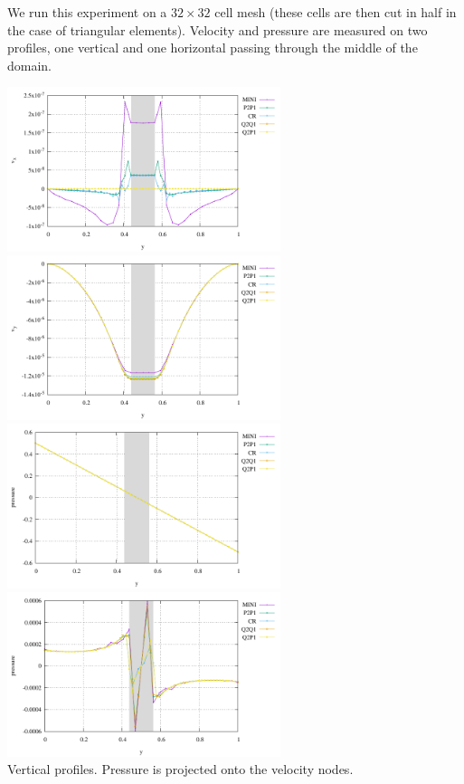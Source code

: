 We run this experiment on a $32\times 32$ cell mesh (these cells are then cut in half
in the case of triangular elements). Velocity and pressure are measured on two profiles,
one vertical and one horizontal passing through the middle of the domain.   

\begin{center}
\includegraphics[width=8cm]{python_codes/fieldstone_112/results/exp2/vprofile_u.pdf}
\includegraphics[width=8cm]{python_codes/fieldstone_112/results/exp2/vprofile_v.pdf}\\
\includegraphics[width=8cm]{python_codes/fieldstone_112/results/exp2/vprofile_p.pdf}
\includegraphics[width=8cm]{python_codes/fieldstone_112/results/exp2/vprofile_pdyn.pdf}\\
{\captionfont Vertical profiles. Pressure is projected onto the velocity nodes.}
\end{center}

